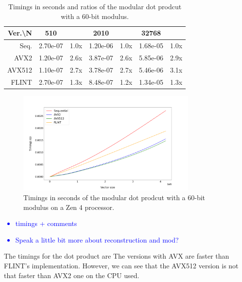 \documentclass[a4paper]{article}
\begin{document}
\begin{table}[h!]
\begin{tabular}{|r|*{3}{c c|}}
        \hline
        \rowcolor{myGray}
        Ver.\textbackslash N & 510 & & 2010 & & 32768 & \\
        \hline
        \cellcolor{myGray} Seq. & 2.70e-07 & 1.0x & 1.20e-06 & 1.0x & 1.68e-05 & 1.0x \\
        \hline
        \cellcolor{myGray} AVX2 & 1.20e-07 & 2.6x & 3.87e-07 & 2.6x & 5.85e-06 & 2.9x \\
        \hline
        \cellcolor{myGray} AVX512 & 1.10e-07 & 2.7x & 3.78e-07 & 2.7x & 5.46e-06 & 3.1x \\
        \hline
        \cellcolor{myGray} FLINT & 2.70e-07 & 1.3x & 8.48e-07 & 1.2x & 1.34e-05 & 1.3x \\
        \hline
    \end{tabular}
    \caption{Timings in seconds and ratios of the modular dot prodcut with a 60-bit modulus.}
\end{table}

\begin{figure}[h!]
    \begin{center}
        \includegraphics[width=0.8\textwidth]{dot-prod-mod_argiope.png}
    \end{center}
    \caption{Timings in seconds of the modular dot prodcut with a 60-bit modulus on a Zen 4 processor.}
\end{figure}

\textcolor{blue}{
    \begin{itemize}
        \item timings + comments
        \item Speak a little bit more about reconstruction and mod?
    \end{itemize}
}

The timings for the dot product are %
The versions with AVX are faster than FLINT's implementation. However,
we can see that the AVX512 version is not that faster than AVX2 one on
the CPU used.
\end{document}

